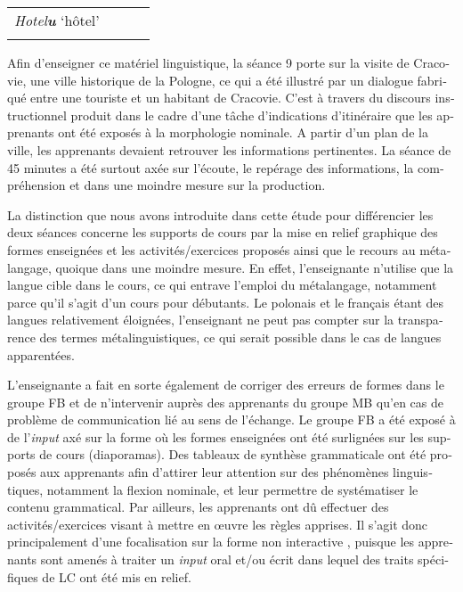 \documentclass[output=paper]{langscibook}
\begin{document}
\begin{otherlanguage}{french}
\begin{sidewaystable}
\begin{tabularx}{\textwidth}{Ql>{\raggedright}p{}>{\raggedright\arraybackslash}p{}}
\textit{Hotel\textbf{u}} `hôtel' & \\
\lspbottomrule
\end{tabularx}
\end{sidewaystable}

Afin d’enseigner ce matériel linguistique, la séance 9 porte sur la visite de Cracovie, une ville historique de la Pologne, ce qui a été illustré par un dialogue fabriqué entre une touriste et un habitant de Cracovie. C’est à travers du discours instructionnel produit dans le cadre d’une tâche d’indications d’itinéraire que les apprenants ont été exposés à la morphologie nominale. A partir d’un plan de la ville, les apprenants devaient retrouver les informations pertinentes. La séance de 45 minutes a été surtout axée sur l’écoute, le repérage des informations, la compréhension et dans une moindre mesure sur la production.

La distinction que nous avons introduite dans cette étude pour différencier les deux séances concerne les supports de cours par la mise en relief graphique des formes enseignées et les activités/exercices proposés ainsi que le recours au métalangage, quoique dans une moindre mesure. En effet, l’enseignante n’utilise que la langue cible dans le cours, ce qui entrave l’emploi du métalangage, notamment parce qu’il s’agit d’un cours pour débutants. Le polonais et le français étant des langues relativement éloignées, l’enseignant ne peut pas compter sur la transparence des termes métalinguistiques, ce qui serait possible dans le cas de langues apparentées.

L’enseignante a fait en sorte également de corriger des erreurs de formes dans le groupe FB et de n’intervenir auprès des apprenants du groupe MB qu’en cas de problème de communication lié au sens de l’échange. Le groupe FB a été exposé à de l’\textit{input} axé sur la forme où les formes enseignées ont été surlignées sur les supports de cours (diaporamas). Des tableaux de synthèse grammaticale ont été proposés aux apprenants afin d’attirer leur attention sur des phénomènes linguistiques, notamment la flexion nominale, et leur permettre de systématiser le contenu grammatical. Par ailleurs, les apprenants ont dû effectuer des activités/exercices visant à mettre en œuvre les règles apprises. Il s’agit donc principalement d’une focalisation sur la forme non interactive \citep{Long2015}, puisque les apprenants sont amenés à traiter un \textit{input} oral et/ou écrit dans lequel des traits spécifiques de LC ont été mis en relief.


\end{otherlanguage}
\end{document}
